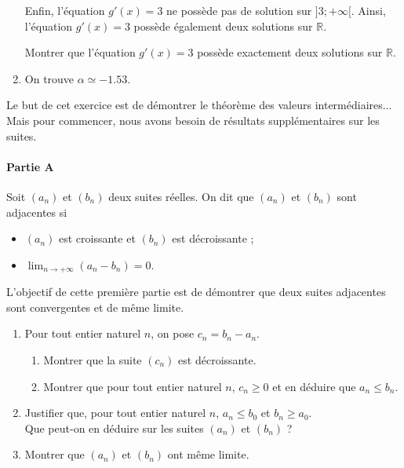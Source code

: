 \documentclass[11pt,fleqn, openany]{book} %
\begin{document}
\begin{solution}
\begin{enumerate}
Enfin, l'équation $g'(x)=3$ ne possède pas de solution sur $]3;+\infty[$. Ainsi, l'équation $g'(x)=3$ possède également deux solutions sur $\mathbb{R}$.

Montrer que l'équation $g'(x)=3$ possède exactement deux solutions sur $\mathbb{R}$. 
\vskip5pt
\item On trouve $\alpha \simeq -1.53$.
\end{enumerate}\end{solution}

\newpage

\begin{exercise}[subtitle={(Démontrer le théorème des valeurs intermédiaires)}]

Le but de cet exercice est de démontrer le théorème des valeurs intermédiaires... Mais pour commencer, nous avons besoin de résultats supplémentaires sur les suites.

\paragraph{Partie A}

Soit $(a_n)$ et $(b_n)$ deux suites réelles. On dit que $(a_n)$ et $(b_n)$ sont adjacentes si
\begin{itemize}
\item $(a_n)$ est croissante et $(b_n)$ est décroissante ;
\item $\displaystyle \lim_{n \to + \infty} (a_n-b_n)=0$.
\end{itemize}
L'objectif de cette première partie est de démontrer que deux suites adjacentes sont convergentes et de même limite.

\begin{enumerate}
\item Pour tout entier naturel $n$, on pose $c_n = b_n-a_n$.
\begin{enumerate}
\item Montrer que la suite $(c_n)$ est décroissante.
\item Montrer que pour tout entier naturel $n$, $c_n \geqslant 0$ et en déduire que $a_n \leqslant b_n$.
\end{enumerate}
\item Justifier que, pour tout entier naturel $n$, $a_n \leqslant b_0$ et $b_n \geqslant a_0$. \\ Que peut-on en déduire sur les suites $(a_n)$ et $(b_n)$ ?
\item Montrer que $(a_n)$ et $(b_n)$ ont même limite.
\end{enumerate}


\end{exercise}
\end{document}
